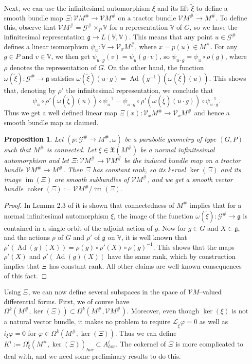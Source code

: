 \documentclass[12pt,a4paper]{amsart}
\def\frak{\mathfrak}
\def\Bbb{\mathbb}
\def\Cal{\mathcal}
\let\phi\varphi
\newcommand{\x}{\times}
\renewcommand{\o}{\circ}
\newcommand{\om}{\omega}
\newcommand{\ph}{\phi}
\newcommand{\ps}{\psi}
\newcommand{\Om}{\Omega}
\renewcommand{\Im}{\operatorname{im}}
\newcommand{\Coker}{\operatorname{coker}}
\newcommand{\Ad}{\operatorname{Ad}}
\newcounter{theorem}
\numberwithin{theorem}{section}
\newtheorem{prop}[theorem]{Proposition}
\theoremstyle{definition}
\theoremstyle{remark}
\begin{document}
Next, we can use the infinitesimal automorphism $\xi$ and its lift
$\tilde\xi$ to define a smooth bundle map $\Xi:\Cal VM^\#\to\Cal
VM^\#$ on a tractor bundle $\Cal VM^\#\to M^\#$. To define this,
observe that $\Cal VM^\#=\Cal G^\#\x_P\Bbb V$ for a representation
$\Bbb V$ of $G$, so we have the infinitesimal representation $\frak
g\to L(\Bbb V,\Bbb V)$. This means that any point $u\in\Cal G^\#$
defines a linear isomorphism $\ps_u:\Bbb V\to \Cal V_xM^\#$, where
$x=p(u)\in M^\#$. For any $g\in P$ and $v\in\Bbb V$, we then get
$\ps_{u\cdot g}(v)=\ps_u(g\cdot v)$, so $\ps_{u\cdot
  g}=\ps_u\o\rho(g)$, where $\rho$ denotes the representation of
$G$. On the other hand, the function $\om(\tilde\xi):\Cal G^\#\to\frak
g$ satisfies $\om(\tilde\xi)(u\cdot
g)=\Ad(g^{-1})(\om(\tilde\xi)(u))$. This shows that, denoting by
$\rho'$ the infinitesimal representation, we conclude that
$$
\ps_u\o \rho'(\om(\tilde\xi)(u))\o\ps_u^{-1}=\ps_{u\cdot g}\o
\rho'(\om(\tilde\xi)(u\cdot g))\o\ps_{u\cdot g}^{-1}.
$$
Thus we get a well defined linear map $\Xi(x):\Cal V_xM^\#\to\Cal
V_xM^\#$ and hence a smooth bundle map as claimed. 

\begin{prop}\label{prop4.2}
  Let $(p:\Cal G^\#\to M^\#,\om)$ be a parabolic geometry of type
  $(G,P)$ such that $M^\#$ is connected. Let $\xi\in\frak X(M^\#)$ be
  a normal infinitesimal automorphism and let $\Xi:\Cal VM^\#\to\Cal
  VM^\#$ be the induced bundle map on a tractor bundle $\Cal VM^\#\to
  M^\#$. Then $\Xi$ has constant rank, so its kernel $\ker(\Xi)$ and
  its image $\Im(\Xi)$ are smooth subbundles of $\Cal VM^\#$, and we
  get a smooth vector bundle $\Coker(\Xi):=\Cal VM^\#/\Im(\Xi)$.
\end{prop}
\begin{proof}
  In Lemma 2.3 of \cite{hol-red} it is shown that connectedness of
  $M^\#$ implies that for a normal infinitesimal automorphism $\xi$, the
  image of the function $\om(\tilde\xi):\Cal G^\#\to\frak g$ is
  contained in a single orbit of the adjoint action of $g$. Now for
  $g\in G$ and $X\in\frak g$, and the actions $\rho$ of $G$ and
  $\rho'$ of $\frak g$ on $\Bbb V$, it is well known that
  $\rho'(\Ad(g)(X))=\rho(g)\o\rho'(X)\o\rho(g)^{-1}$. This shows that
  the maps $\rho'(X)$ and $\rho'(\Ad(g)(X))$ have the same rank, which
  by construction implies that $\Xi$ has constant rank. All other
  claims are well known consequences of this fact.  
\end{proof}

Using $\Xi$, we can now define several subspaces in the space of $\Cal
VM$--valued differential forms. First, we of course have
$\Om^k(M^\#,\ker(\Xi))\subset\Om^k(M^\#,\Cal VM^\#)$. Moreover, even
though $\ker(\xi)$ is not a natural vector bundle, it makes no problem
to require $\Cal L_{\tilde\xi}\ph=0$ as well as $i_\xi\ph=0$ for
$\ph\in\Om^k(M^\#,\ker(\Xi))$. Thus we can define
$K^i:=\Om^i_\xi(M^\#,\ker(\Xi))_{hor}\subset A^i_{hor}$. The cokernel
of $\Xi$ is more complicated to deal with, and we need some
preliminary results to do this.
\end{document}
